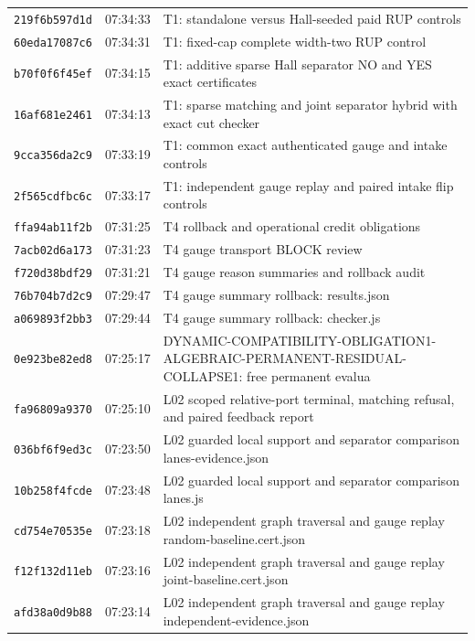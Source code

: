 \documentclass[11pt]{article}
\theoremstyle{remark}
\begin{document}
\begin{longtable}{lll}
\texttt{219f6b597d1d} & 07:34:33 & {\footnotesize T1: standalone versus Hall-seeded paid RUP controls}\\
\texttt{60eda17087c6} & 07:34:31 & {\footnotesize T1: fixed-cap complete width-two RUP control}\\
\texttt{b70f0f6f45ef} & 07:34:15 & {\footnotesize T1: additive sparse Hall separator NO and YES exact certificates}\\
\texttt{16af681e2461} & 07:34:13 & {\footnotesize T1: sparse matching and joint separator hybrid with exact cut checker}\\
\texttt{9cca356da2c9} & 07:33:19 & {\footnotesize T1: common exact authenticated gauge and intake controls}\\
\texttt{2f565cdfbc6c} & 07:33:17 & {\footnotesize T1: independent gauge replay and paired intake flip controls}\\
\texttt{ffa94ab11f2b} & 07:31:25 & {\footnotesize T4 rollback and operational credit obligations}\\
\texttt{7acb02d6a173} & 07:31:23 & {\footnotesize T4 gauge transport BLOCK review}\\
\texttt{f720d38bdf29} & 07:31:21 & {\footnotesize T4 gauge reason summaries and rollback audit}\\
\texttt{76b704b7d2c9} & 07:29:47 & {\footnotesize T4 gauge summary rollback: results.json}\\
\texttt{a069893f2bb3} & 07:29:44 & {\footnotesize T4 gauge summary rollback: checker.js}\\
\texttt{0e923be82ed8} & 07:25:17 & {\footnotesize DYNAMIC-COMPATIBILITY-OBLIGATION1-ALGEBRAIC-PERMANENT-RESIDUAL-COLLAPSE1: free permanent evalua}\\
\texttt{fa96809a9370} & 07:25:10 & {\footnotesize L02 scoped relative-port terminal, matching refusal, and paired feedback report}\\
\texttt{036bf6f9ed3c} & 07:23:50 & {\footnotesize L02 guarded local support and separator comparison lanes-evidence.json}\\
\texttt{10b258f4fcde} & 07:23:48 & {\footnotesize L02 guarded local support and separator comparison lanes.js}\\
\texttt{cd754e70535e} & 07:23:18 & {\footnotesize L02 independent graph traversal and gauge replay random-baseline.cert.json}\\
\texttt{f12f132d11eb} & 07:23:16 & {\footnotesize L02 independent graph traversal and gauge replay joint-baseline.cert.json}\\
\texttt{afd38a0d9b88} & 07:23:14 & {\footnotesize L02 independent graph traversal and gauge replay independent-evidence.json}\\

\end{longtable}
\end{document}
